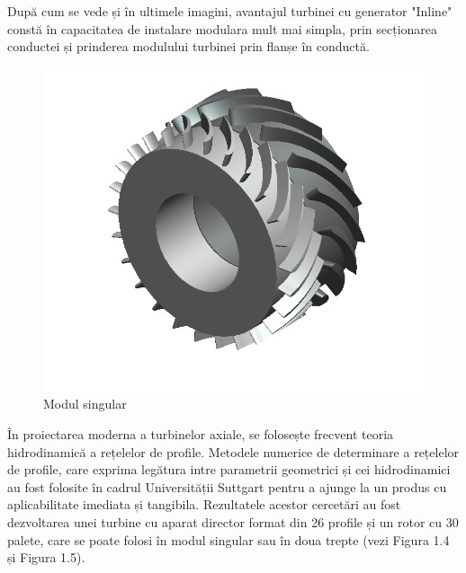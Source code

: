 După cum se vede și în ultimele imagini, avantajul turbinei cu generator "Inline" constă în capacitatea de instalare modulara mult mai simpla, prin secționarea conductei și prinderea modulului turbinei prin flanșe în conductă.

\begin{figure}[h!]
	\centering
	\includegraphics[scale=0.6]{figures/modul_singular.png}
	\caption{Modul singular \cite{susanhub}}
	\label{Modul singular}
\end{figure}

În proiectarea moderna a turbinelor axiale, se folosește frecvent teoria hidrodinamică a rețelelor de profile. Metodele numerice de determinare a rețelelor de profile, care exprima legătura intre parametrii geometrici și cei hidrodinamici au fost folosite în cadrul Universității Suttgart pentru a ajunge la un produs cu aplicabilitate imediata și tangibila. Rezultatele acestor cercetări au fost dezvoltarea unei turbine cu aparat director format din 26 profile și un rotor cu 30 palete, care se poate folosi în modul singular sau în doua trepte (vezi Figura 1.4 și Figura 1.5).

